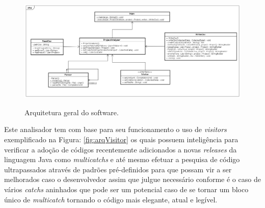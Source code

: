 \begin{figure}[h]
	\center
	\includegraphics[scale=0.3]{Imagens/Arquitetura}
	\label{fig:arqGeral}
	\caption{Arquitetura geral do software.}
\end{figure}

Este analisador tem com base para seu funcionamento o uso de {\it visitors} \cite{Gamma:1995:DPE:186897} exemplificado na Figura: \ref{fig:arqVisitor} os quais possuem inteligência para verificar a adoção de códigos recentemente adicionados a novas {\it releases} da linguagem Java como {\it multicatchs} e até mesmo efetuar a pesquisa de código ultrapassados através de padrões pré-definidos para que possam vir a ser melhorados caso o desenvolvedor assim que julgue necessário conforme é o caso de vários {\it catchs} aninhados que pode ser um potencial caso de se tornar um bloco único de {\it multicatch} tornando o código mais elegante, atual e legível.\\



